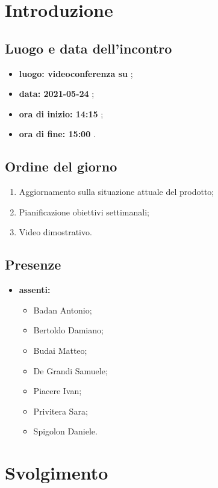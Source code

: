 \section*{Introduzione}
\subsection*{Luogo e data dell'incontro}
\begin{itemize}
	\item \textbf{luogo: videoconferenza su } ;
	\item \textbf{data: 2021-05-24} ;
	\item \textbf{ora di inizio: 14:15} ;
	\item \textbf{ora di fine: 15:00} .
\end{itemize}

\subsection*{Ordine del giorno}
\begin{enumerate}
	\item Aggiornamento sulla situazione attuale del prodotto;
	\item Pianificazione obiettivi settimanali;
	\item Video dimostrativo.
\end{enumerate}

\subsection*{Presenze}
\begin{itemize}
	\item \textbf{assenti:}
	\begin{itemize}
		\item Badan Antonio;
		\item Bertoldo Damiano;
		\item Budai Matteo;
		\item De Grandi Samuele;
		\item Piacere Ivan;
		\item Privitera Sara;
		\item Spigolon Daniele.
	\end{itemize}
\end{itemize}

\section*{Svolgimento}
